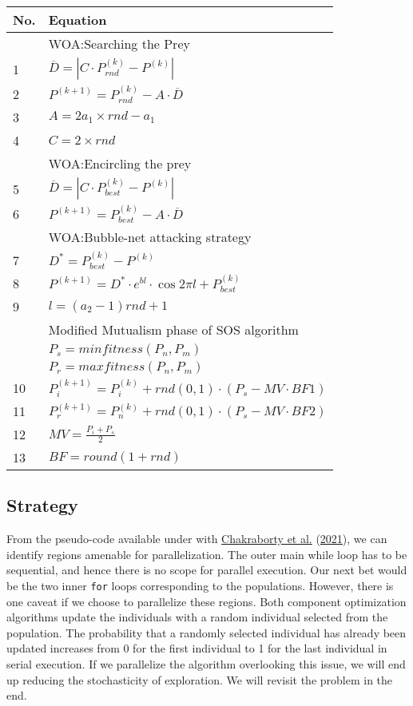 \begin{longtable}[]{@{}ll@{}}
\toprule
No. & Equation \\
\midrule
\endhead
& WOA:Searching the Prey \\
1 & \(\overline{D}=| C\cdot P^{(k)}_{rnd}-P^{(k)}|\) \\
2 & \(P^{(k+1)}=P^{(k)}_{rnd}-A\cdot \overline{D}\) \\
3 & \(A = 2a_1 \times rnd - a_1\) \\
4 & \(C = 2 \times rnd\) \\
& WOA:Encircling the prey \\
5 & \(\overline{D}=|C\cdot P^{(k)}_{best}-P^{(k)}|\) \\
6 & \(P^{(k+1)}= P^{(k)}_{best}-A\cdot \overline{D}\) \\
& WOA:Bubble-net attacking strategy \\
7 & \(D^*= P^{(k)}_{best}-P^{(k)}\) \\
8 &
\(P^{(k+1)}= D^*\cdot e^{bl} \cdot \cos{2\pi l} + P^{(k)}_{best}\) \\
9 & \(l = (a_2 - 1)rnd + 1\) \\
& Modified Mutualism phase of SOS algorithm \\
& \(P_s=min fitness(P_n,P_m)\) \\
& \(P_r=max fitness(P_n,P_m)\) \\
10 & \(P^{(k+1)}_i= P^{(k)}_i+rnd(0, 1)\cdot(P_s - MV\cdot BF1)\) \\
11 & \(P^{(k+1)}_r= P^{(k)}_n+rnd(0, 1)\cdot(P_s - MV\cdot BF2)\) \\
12 & \(MV = \frac{P_i+P_s}{2}\) \\
13 & \(BF = round(1+rnd)\) \\
\bottomrule
\end{longtable}

\hypertarget{strategy}{%
\subsection{Strategy}\label{strategy}}

From the pseudo-code available under with
\protect\hyperlink{ref-chakrabortyNovelEnhancedWhale2021}{Chakraborty et
al.} (\protect\hyperlink{ref-chakrabortyNovelEnhancedWhale2021}{2021}),
we can identify regions amenable for parallelization. The outer main
while loop has to be sequential, and hence there is no scope for
parallel execution. Our next bet would be the two inner \texttt{for}
loops corresponding to the populations. However, there is one caveat if
we choose to parallelize these regions. Both component optimization
algorithms update the individuals with a random individual selected from
the population. The probability that a randomly selected individual has
already been updated increases from 0 for the first individual to 1 for
the last individual in serial execution. If we parallelize the algorithm
overlooking this issue, we will end up reducing the stochasticity of
exploration. We will revisit the problem in the end.

